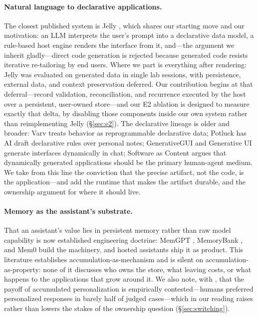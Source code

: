 \documentclass[11pt]{article}
\begin{document}
\paragraph{Natural language to declarative applications.}
The closest published system is Jelly \citep{jelly}, which shares our starting
move and our motivation: an LLM interprets the user's prompt into a declarative
data model, a rule-based host engine renders the interface from it, and---the
argument we inherit gladly---direct code generation is rejected because generated
code resists iterative re-tailoring by end users. Where we part is everything
after rendering: Jelly was evaluated on generated data in single lab sessions,
with persistence, external data, and context preservation deferred. Our
contribution begins at that deferral---record validation, reconciliation, and
recurrence executed by the host over a persistent, user-owned store---and our E2
ablation is designed to measure exactly that delta, by disabling those components
inside our own system rather than reimplementing Jelly (\S\ref{sec:e2}). The
declarative lineage is older and broader: Varv \citep{varv} treats behavior as
reprogrammable declarative data; Potluck \citep{potluck} has AI draft declarative
rules over personal notes; GenerativeGUI \citep{generative-gui} and Generative UI
\citep{generative-ui} generate interfaces dynamically in chat; Software as
Content \citep{software-as-content} argues that dynamically generated
applications should be the primary human-agent medium. We take from this line the
conviction that the precise artifact, not the code, is the application---and add
the runtime that makes the artifact durable, and the ownership argument for where
it should live.

\paragraph{Memory as the assistant's substrate.}
That an assistant's value lies in persistent memory rather than raw model
capability is now established engineering doctrine: MemGPT \citep{memgpt},
MemoryBank \citep{memorybank}, and Mem0 \citep{mem0} build the machinery, and
hosted assistants ship it as product. This literature establishes
accumulation-as-mechanism and is silent on accumulation-as-property: none of it
discusses who owns the store, what leaving costs, or what happens to the
applications that grow around it. We also note, with \citep{recentering-humans},
that the payoff of accumulated personalization is empirically
contested---humans preferred personalized responses in barely half of judged
cases---which in our reading raises rather than lowers the stakes of the
ownership question (\S\ref{sec:switching}).
\end{document}
